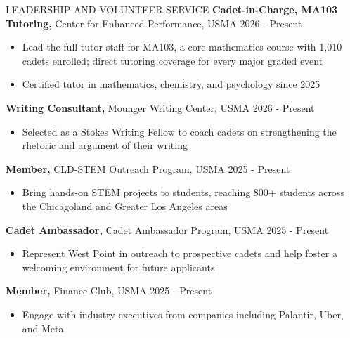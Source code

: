 \documentclass{resume}
\begin{document}
\begin{rSection}{LEADERSHIP AND VOLUNTEER SERVICE} \itemsep -3pt
{\textbf{Cadet-in-Charge, MA103 Tutoring,} Center for Enhanced Performance, USMA} \hfill {2026 - Present}
\vspace{-5pt}
\begin{itemize}
\setlength\itemsep{-1.5ex}
    \item Lead the full tutor staff for MA103, a core mathematics course with 1,010 cadets enrolled; direct tutoring coverage for every major graded event
    \item Certified tutor in mathematics, chemistry, and psychology since 2025
\end{itemize}

{\textbf{Writing Consultant,} Mounger Writing Center, USMA} \hfill {2026 - Present}
\vspace{-5pt}
\begin{itemize}
\setlength\itemsep{-1.5ex}
    \item Selected as a Stokes Writing Fellow to coach cadets on strengthening the rhetoric and argument of their writing
\end{itemize}

{\textbf{Member,} CLD-STEM Outreach Program, USMA} \hfill {2025 - Present}
\vspace{-5pt}
\begin{itemize}
\setlength\itemsep{-1.5ex}
    \item Bring hands-on STEM projects to students, reaching 800+ students across the Chicagoland and Greater Los Angeles areas
\end{itemize}

{\textbf{Cadet Ambassador,} Cadet Ambassador Program, USMA} \hfill {2025 - Present}
\vspace{-5pt}
\begin{itemize}
\setlength\itemsep{-1.5ex}
    \item Represent West Point in outreach to prospective cadets and help foster a welcoming environment for future applicants
\end{itemize}

{\textbf{Member,} Finance Club, USMA} \hfill {2025 - Present}
\vspace{-5pt}
\begin{itemize}
\setlength\itemsep{-1.5ex}
    \item Engage with industry executives from companies including Palantir, Uber, and Meta
\end{itemize}


\end{rSection}
\end{document}
